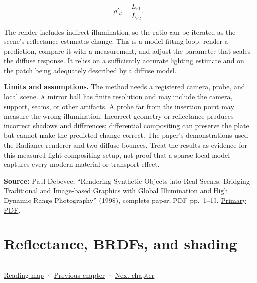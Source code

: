 \[\rho'_d=\frac{L_{r1}}{L_{r2}}.\]

The render includes indirect illumination, so the ratio can be iterated as the scene's reflectance estimates change. This is a model-fitting loop: render a prediction, compare it with a measurement, and adjust the parameter that scales the diffuse response. It relies on a sufficiently accurate lighting estimate and on the patch being adequately described by a diffuse model.

\textbf{Limits and assumptions.} The method needs a registered camera, probe, and local scene. A mirror ball has finite resolution and may include the camera, support, seams, or other artifacts. A probe far from the insertion point may measure the wrong illumination. Incorrect geometry or reflectance produces incorrect shadows and differences; differential compositing can preserve the plate but cannot make the predicted change correct. The paper's demonstrations used the Radiance renderer and two diffuse bounces. Treat the results as evidence for this measured-light compositing setup, not proof that a sparse local model captures every modern material or transport effect.

\textbf{Source:} Paul Debevec, ``Rendering Synthetic Objects into Real Scenes: Bridging Traditional and Image-based Graphics with Global Illumination and High Dynamic Range Photography'' (1998), complete paper, PDF pp.~1--10. \href{https://www.pauldebevec.com/Research/IBL/debevec-siggraph98.pdf}{Primary PDF}.

\section{Reflectance, BRDFs, and shading}\label{03-visual-computing-i-ch004-reflectance-brdfs-and-shading}

\begin{center}\rule{0.5\linewidth}{0.5pt}\end{center}

\hyperref[volume-reading-map]{Reading map} · \hyperref[03-visual-computing-i-ch003]{Previous chapter} · \hyperref[03-visual-computing-i-ch005]{Next chapter}
